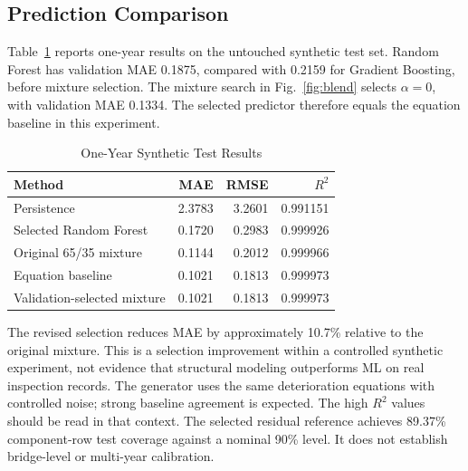 \documentclass[conference]{IEEEtran}
\begin{document}
\subsection{Prediction Comparison}
Table~\ref{tab:prediction} reports one-year results on the untouched synthetic test set. Random Forest has validation MAE 0.1875, compared with 0.2159 for Gradient Boosting, before mixture selection. The mixture search in Fig.~\ref{fig:blend} selects $\alpha=0$, with validation MAE 0.1334. The selected predictor therefore equals the equation baseline in this experiment.
\begin{table}[t]
\caption{One-Year Synthetic Test Results}
\label{tab:prediction}\centering
\begin{tabular}{lrrr}\toprule
Method & MAE & RMSE & $R^2$\\\midrule
Persistence & 2.3783 & 3.2601 & 0.991151\\
Selected Random Forest & 0.1720 & 0.2983 & 0.999926\\
Original 65/35 mixture & 0.1144 & 0.2012 & 0.999966\\
Equation baseline & 0.1021 & 0.1813 & 0.999973\\
Validation-selected mixture & 0.1021 & 0.1813 & 0.999973\\\bottomrule
\end{tabular}
\end{table}
The revised selection reduces MAE by approximately 10.7\% relative to the original mixture. This is a selection improvement within a controlled synthetic experiment, not evidence that structural modeling outperforms ML on real inspection records. The generator uses the same deterioration equations with controlled noise; strong baseline agreement is expected. The high $R^2$ values should be read in that context. The selected residual reference achieves 89.37\% component-row test coverage against a nominal 90\% level. It does not establish bridge-level or multi-year calibration.
\end{document}
